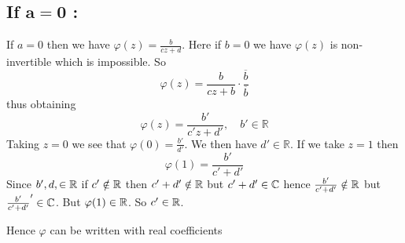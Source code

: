 \documentclass[a4paper, 11pt]{article}
\begin{document}
{		\subsection*{If $\boldsymbol{a = 0}$ :}\parinf
		If $a=0$ then we have $\varphi(z)=\frac{b}{c z+d}$. Here if $b=0$ we have  $\varphi(z)$ is non-invertible which is impossible. So  $$\varphi(z)=\frac{b}{c z+b} \cdot \frac{\overline{b}}{\overline{b}}$$ thus obtaining
		$$
		\varphi(z)=\frac{b'}{c' z+d'}, \quad b' \in \mathbb{R}
		$$
		Taking $z=0$ we see that $\varphi(0)= \frac{b'}{d'}$. We then have $d' \in \mathbb{R}$. If we take $z=1$ then $$\varphi(1)=\frac{b'}{c'+d'}$$Since $b',d,\in\mathbb{R}$ if $c'\notin \mathbb{R}$ then $c'+d'\notin \mathbb{R}$ but $c'+d'\in\mathbb{C}$ hence $\frac{b'}{c'+d'}\notin \mathbb{R}$ but $\frac{b'}{c'+d'}'\in\mathbb{C}$. But $\varphi(1)\in\mathbb{R}$. So $c'\in \mathbb{R}$. 
		
		\parinn
		
		Hence $\varphi$ can be written with real coefficients
		
}
	

	
\end{document}
